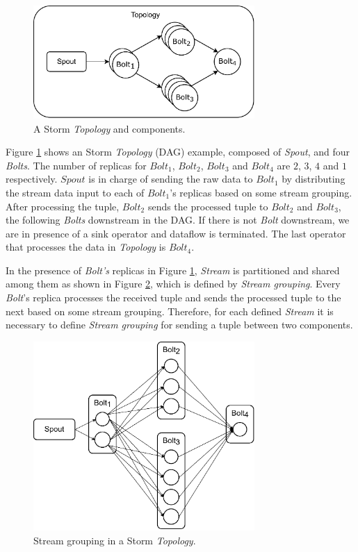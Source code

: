 \begin{figure}[!ht]
    \centering
    \includegraphics[width=0.75\textwidth]{figures/concepts/Storm-Logical.pdf}
    \caption{A Storm \textit{Topology} and components.}
    \label{fig:storm-logical}
\end{figure}


Figure \ref{fig:storm-logical} shows an Storm \textit{Topology} (DAG) example, composed of \textit{Spout}, and four \textit{Bolts}. The number of replicas for $Bolt_1$, $Bolt_2$, $Bolt_3$ and $Bolt_4$ are $2$, $3$, $4$ and $1$ respectively. $Spout$ is in charge of sending the raw data to $Bolt_1$ by distributing the stream data input to each of $Bolt_1$'s replicas based on some stream grouping. After processing the tuple, $Bolt_2$ sends the processed tuple to $Bolt_2$ and $Bolt_3$, the following \textit{Bolts} downstream in the DAG. If there is not \textit{Bolt} downstream, we are in presence of a sink operator and dataflow is terminated. The last operator that processes the data in \textit{Topology} is $Bolt_4$.


In the presence of \textit{Bolt's} replicas in Figure \ref{fig:storm-logical}, \textit{Stream} is partitioned and shared among them as shown in Figure \ref{fig:storm-stream-grouping}, which is defined by \textit{Stream grouping}. Every \textit{Bolt}'s replica processes the received tuple and sends the processed tuple to the next based on some stream grouping. Therefore, for each defined \textit{Stream} it is necessary to define \textit{Stream grouping} for sending a tuple between two components.

\begin{figure}[!ht]
    \centering
    \includegraphics[width=0.75\textwidth]{figures/concepts/Storm-Stream-Grouping.pdf}
    \caption{Stream grouping in a Storm \textit{Topology}.}
    \label{fig:storm-stream-grouping}
\end{figure}

